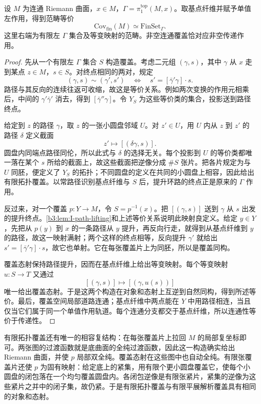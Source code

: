 \begin{proposition}\label{b3:prop:I-topological-cover-classification}
	设 \(M\) 为连通 Riemann 曲面，\(x\in M\)，\(\Gamma=\pi_1^{\mathrm{top}}(M,x)\)。取基点纤维并赋予单值左作用，得到范畴等价
	\[
		\mathrm{Cov}_{\mathrm{fin}}(M)
		\simeq \mathrm{FinSet}_{\Gamma}.
	\]
	这里右端为有限左 \(\Gamma\) 集合及等变映射的范畴。非空连通覆盖恰对应非空传递作用。
\end{proposition}
\begin{proof}
	先从一个有限左 \(\Gamma\) 集合 \(S\) 构造覆盖。考虑二元组 \((\gamma,s)\)，其中 \(\gamma\) 从 \(x\) 走到某点 \(z\in M\)，\(s\in S\)。对终点相同的两对，规定
	\[
		(\gamma,s)\sim(\gamma',s')
		\quad\Longleftrightarrow\quad
		s'=[\bar\gamma'\gamma]\cdot s.
	\]
	路径与其反向的连续往返可收缩，故这是等价关系。例如两次变换的作用元相乘后，中间的 \(\gamma'\bar\gamma'\) 消去，得到 \([\bar\gamma''\gamma]\)。令 \(Y_S\) 为这些等价类的集合，投影送到路径终点。

	给定到 \(z\) 的路径 \(\gamma\)，取 \(z\) 的一张小圆盘邻域 \(U\)。对 \(z'\in U\)，用 \(U\) 内从 \(z\) 到 \(z'\) 的路径 \(\delta\) 定义截面
	\[
		z'\longmapsto[(\delta\gamma,s)].
	\]
	圆盘内同端点路径同伦，所以此式与 \(\delta\) 的选择无关。每个投影到 \(U\) 的等价类都唯一落在某个 \(s\) 所给的截面上，故这些截面把逆像分成 \(\#S\) 张片。把各片规定为与 \(U\) 同胚，便定义了 \(Y_S\) 的拓扑；不同圆盘的定义在共同的小圆盘上相容，因此给出有限拓扑覆盖。以常路径识别基点纤维与 \(S\) 后，提升环路的终点正是原来的 \(\Gamma\) 作用。

	反过来，对一个覆盖 \(p:Y\rightarrow M\)，令 \(S=p^{-1}(x)\)。把 \([(\gamma,s)]\) 送到 \(\gamma\) 从 \(s\) 出发的提升终点。\cref{b3:lem:I-path-lifting}和上述等价关系说明此映射良定义。给定 \(y\in Y\)，先把从 \(p(y)\) 到 \(x\) 的一条路径从 \(y\) 提升，再反向行走，就得到从基点纤维到 \(y\) 的路径，故这一映射满射；两个这样的终点相等，反向提升 \(\gamma'\) 就给出 \(s'=[\bar\gamma'\gamma]\cdot s\)，故它也单射。它在每张覆盖片上为同胚，所以是覆盖同构。

	覆盖态射保持路径提升，因而在基点纤维上给出等变映射。每个等变映射 \(u:S\rightarrow T\) 又通过
	\[
		[(\gamma,s)]\longmapsto[(\gamma,u(s))]
	\]
	唯一给出覆盖态射。于是这两个构造在对象和态射上互逆到自然同构，得到所述等价。最后，覆盖空间局部道路连通；基点纤维中两点能在 \(Y\) 中用路径相连，当且仅当它们属于同一个单值作用轨道。每个连通分支都交于基点纤维，所以连通性等价于传递性。
\end{proof}

有限拓扑覆盖还有唯一的相容复结构：在每张覆盖片上拉回 \(M\) 的局部复坐标即可。两张图的过渡函数就是底曲面的全纯过渡函数，因此这一构造确实给出 Riemann 曲面，并使 \(p\) 局部双全纯。覆盖态射在这些图中也自动全纯。有限张覆盖片还使 \(p\) 为固有映射：给定底上的紧集，用有限个更小圆盘覆盖它，使每个小圆盘的闭包落在一个均匀覆盖圆盘内。各闭包逆像是有限张紧片，紧集的逆像为这些紧片之并中的闭子集，故仍紧。于是有限拓扑覆盖与有限平展解析覆盖具有相同的对象和态射。

